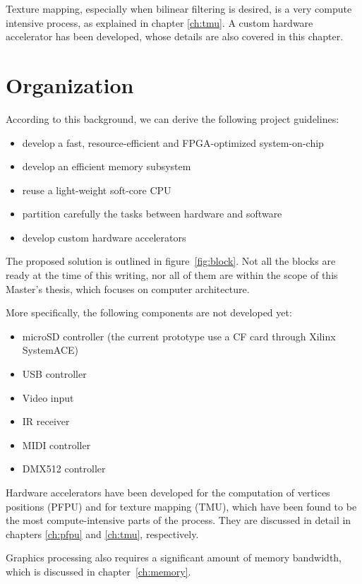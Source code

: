 \documentclass[a4paper,11pt]{kthesis}
\begin{document}
Texture mapping, especially when bilinear filtering is desired, is a very compute intensive process, as explained in chapter \ref{ch:tmu}. A custom hardware accelerator has been developed, whose details are also covered in this chapter.

\section{Organization}
According to this background, we can derive the following project guidelines:

\begin{itemize}
\item develop a fast, resource-efficient and FPGA-optimized system-on-chip
\item develop an efficient memory subsystem
\item reuse a light-weight soft-core CPU
\item partition carefully the tasks between hardware and software
\item develop custom hardware accelerators
\end{itemize}

The proposed solution is outlined in figure~\ref{fig:block}. Not all the blocks are ready at the time of this writing, nor all of them are within the scope of this Master's thesis, which focuses on computer architecture.

More specifically, the following components are not developed yet:
\begin{itemize}
\item microSD controller (the current prototype use a CF card through Xilinx SystemACE)
\item USB controller
\item Video input
\item IR receiver
\item MIDI controller
\item DMX512 controller
\end{itemize}

Hardware accelerators have been developed for the computation of vertices positions (PFPU) and for texture mapping (TMU), which have been found to be the most compute-intensive parts of the process. They are discussed in detail in chapters \ref{ch:pfpu} and \ref{ch:tmu}, respectively.

Graphics processing also requires a significant amount of memory bandwidth, which is discussed in chapter~\ref{ch:memory}.
\end{document}
